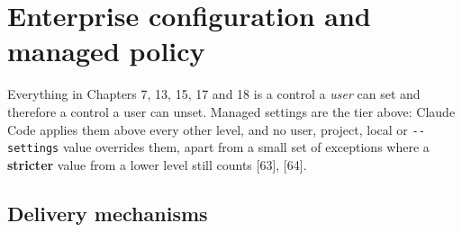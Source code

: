 \documentclass[11pt,a4paper,twoside,openany]{book}
\newcommand{\chaptertitlelabel}{}
\begin{document}
\FloatBarrier
\renewcommand{\chaptertitlelabel}{Part VIII \textperiodcentered\ Chapter 31}
\setcounter{chapter}{30}
\chapter{Enterprise configuration and managed policy}

Everything in Chapters 7, 13, 15, 17 and 18 is a control a \emph{user} can set and therefore a control a user can unset. Managed settings are the tier above: Claude Code applies them above every other level, and no user, project, local or \texttt{-\allowbreak{}-\allowbreak{}settings} value overrides them, apart from a small set of exceptions where a \textbf{stricter} value from a lower level still counts [63], [64].


\FloatBarrier
\setcounter{section}{0}
\section{Delivery mechanisms}
\end{document}

